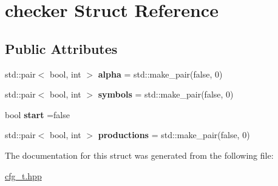 \hypertarget{structchecker}{}\section{checker Struct Reference}
\label{structchecker}
\subsection*{Public Attributes}
\begin{DoxyCompactItemize}
\item 
\mbox{\label{structchecker_a2087867a99b21a173e7b39b74c0a3877}} 
std\+::pair$<$ bool, int $>$ {\bfseries alpha} = std\+::make\+\_\+pair(false, 0)
\item 
\mbox{\label{structchecker_a97375c5c95811b6a8bbbecd28e22f44b}} 
std\+::pair$<$ bool, int $>$ {\bfseries symbols} = std\+::make\+\_\+pair(false, 0)
\item 
\mbox{\label{structchecker_a72b62e901ff25deb621afe79415cf383}} 
bool {\bfseries start} =false
\item 
\mbox{\label{structchecker_a5d04a5a28e8194b87be3b18cfe837a79}} 
std\+::pair$<$ bool, int $>$ {\bfseries productions} = std\+::make\+\_\+pair(false, 0)
\end{DoxyCompactItemize}


The documentation for this struct was generated from the following file\+:\begin{DoxyCompactItemize}
\item 
\hyperlink{cfg__t_8hpp}{cfg\+\_\+t.\+hpp}\end{DoxyCompactItemize}
